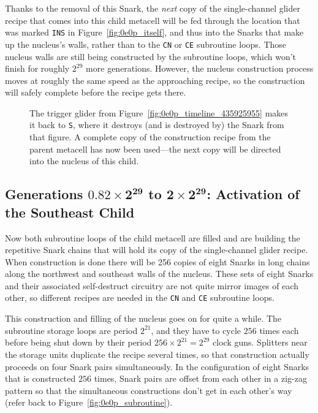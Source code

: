 Thanks to the removal of this Snark, the \emph{next} copy of the single-channel glider recipe that comes into this child metacell will be fed through the location that was marked \texttt{INS} in Figure~\ref{fig:0e0p_itself}, and thus into the Snarks that make up the nucleus's walls, rather than to the \texttt{CN} or \texttt{CE} subroutine loops. Those nucleus walls are still being constructed by the subroutine loops, which won't finish for roughly $2^{29}$ more generations. However, the nucleus construction process moves at roughly the same speed as the approaching recipe, so the construction will safely complete before the recipe gets there.

\begin{figure}[!htb]
	\centering
	\caption{The trigger glider from Figure~\ref{fig:0e0p_timeline_435925955} makes it back to \texttt{S}, where it destroys (and is destroyed by) the Snark from that figure. A complete copy of the construction recipe from the parent metacell has now been used---the next copy will be directed into the nucleus of this child.}
	\label{fig:0e0p_timeline_438935522}
\end{figure}


\subsection{Generations $\mathbf{0.82 \times 2^{29}}$ to $\mathbf{2 \times 2^{29}}$: Activation of the Southeast Child}\label{sec:0e0p_timeline_nucleus_fill}

Now both subroutine loops of the child metacell are filled and are building the repetitive Snark chains that will hold its copy of the single-channel glider recipe. When construction is done there will be 256 copies of eight Snarks in long chains along the northwest and southeast walls of the nucleus. These sets of eight Snarks and their associated self-destruct circuitry are not quite mirror images of each other, so different recipes are needed in the \texttt{CN} and \texttt{CE} subroutine loops.

This construction and filling of the nucleus goes on for quite a while. The subroutine storage loops are period $2^{21}$, and they have to cycle $256$ times each before being shut down by their period $256 \times 2^{21} = 2^{29}$ clock guns. Splitters near the storage units duplicate the recipe several times, so that construction actually proceeds on four Snark pairs simultaneously. In the configuration of eight Snarks that is constructed $256$ times, Snark pairs are offset from each other in a zig-zag pattern so that the simultaneous constructions don't get in each other's way (refer back to Figure~\ref{fig:0e0p_subroutine}).

